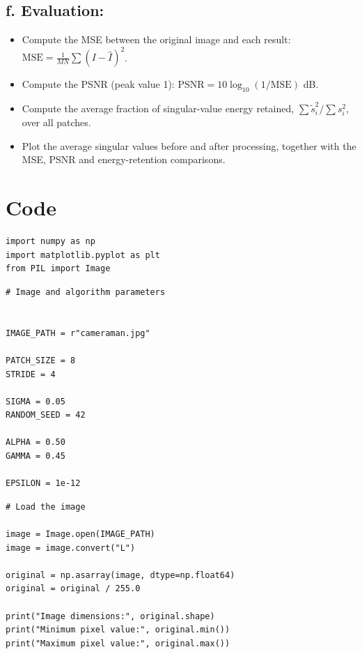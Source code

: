 \documentclass{article}
\begin{document}
\begin{flushleft}
\subsection*{f. Evaluation:}
\begin{itemize}
    \item Compute the MSE between the original image and each result:
    $\mathrm{MSE} = \frac{1}{MN}\sum (I - \hat{I})^2$.
    \item Compute the PSNR (peak value 1): $\mathrm{PSNR} = 10 \log_{10}\left(1 / \mathrm{MSE}\right)$ dB.
    \item Compute the average fraction of singular-value energy retained, $\sum \tilde{s}_i^2 / \sum s_i^2$, over all patches.
    \item Plot the average singular values before and after processing, together with the MSE, PSNR and energy-retention comparisons.
\end{itemize}
\newpage

\section{Code}
\begin{lstlisting}[caption={Importing libraries}]
import numpy as np
import matplotlib.pyplot as plt
from PIL import Image
\end{lstlisting}

\begin{lstlisting}[caption={Image and algorithm parameters}]
# Image and algorithm parameters


IMAGE_PATH = r"cameraman.jpg"

PATCH_SIZE = 8
STRIDE = 4

SIGMA = 0.05
RANDOM_SEED = 42

ALPHA = 0.50
GAMMA = 0.45

EPSILON = 1e-12
\end{lstlisting}

\begin{lstlisting}[caption={Loading the image and converting it to normalised grayscale}]
# Load the image

image = Image.open(IMAGE_PATH)
image = image.convert("L")

original = np.asarray(image, dtype=np.float64)
original = original / 255.0

print("Image dimensions:", original.shape)
print("Minimum pixel value:", original.min())
print("Maximum pixel value:", original.max())
\end{lstlisting}


\end{flushleft}
\end{document}

